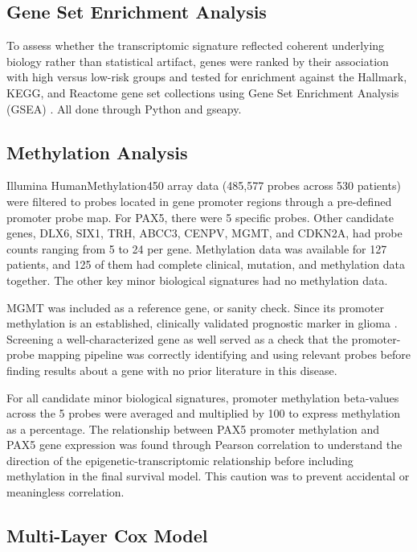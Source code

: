 \documentclass[11pt, letterpaper]{article}
\begin{document}
\subsection{Gene Set Enrichment Analysis}

To assess whether the transcriptomic signature reflected coherent underlying biology rather than statistical artifact, genes were ranked by their association with high versus low-risk groups and tested for enrichment against the Hallmark, KEGG, and Reactome gene set collections using Gene Set Enrichment Analysis (GSEA) \cite{Subramanian2005}. All done through Python and gseapy. 


\subsection{Methylation Analysis}

Illumina HumanMethylation450 array data \cite{Bibikova2011} (485,577 probes across 530 patients) were filtered to probes located in gene promoter regions through a pre-defined promoter probe map. For PAX5, there were 5 specific probes. Other candidate genes, DLX6, SIX1, TRH, ABCC3, CENPV, MGMT, and CDKN2A, had probe counts ranging from 5 to 24 per gene. Methylation data was available for 127 patients, and 125 of them had complete clinical, mutation, and methylation data together. The other key minor biological signatures had no methylation data.

MGMT was included as a reference gene, or sanity check. Since its promoter methylation is an established, clinically validated prognostic marker in glioma \cite{Hegi2005}. Screening a well-characterized gene as well served as a check that the promoter-probe mapping pipeline was correctly identifying and using relevant probes before finding results about a gene with no prior literature in this disease. 

For all candidate minor biological signatures, promoter methylation beta-values across the 5 probes were averaged and multiplied by 100 to express methylation as a percentage. The relationship between PAX5 promoter methylation and PAX5 gene expression was found through Pearson correlation to understand the direction of the epigenetic-transcriptomic relationship before including methylation in the final survival model. This caution was to prevent accidental or meaningless correlation.

\subsection{Multi-Layer Cox Model}  
\end{document}
